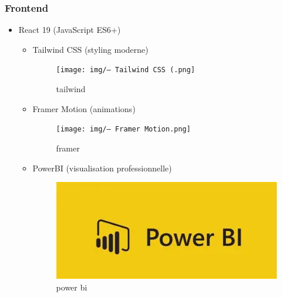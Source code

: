 \subsubsection{Frontend}
\begin{itemize}
    \item React 19 (JavaScript ES6+)
    \begin{itemize}
    
    \begin{figure}[H]
    \centering
    \texttt{[image: img/— React 19.png]}
    \caption{React}
    \label{fig:React}
\end{figure}
    \item Tailwind CSS (styling moderne)
     \begin{figure}[H]
    \centering
    \texttt{[image: img/— Tailwind CSS (.png]}
    \caption{tailwind}
    \label{fig:tailwind}
\end{figure}
    \item Framer Motion (animations)
    \begin{figure}[H]
    \centering
    \texttt{[image: img/— Framer Motion.png]}
    \caption{framer}
    \label{fig:framer}
\end{figure}
    \item PowerBI (visualisation professionnelle)
    \begin{figure}[H]
    \centering
    \includegraphics[width=\figwidth]{img/power bu.png}
    \caption{power bi}
    \label{fig:power bi}
\end{figure}
\end{itemize}


\end{itemize}
